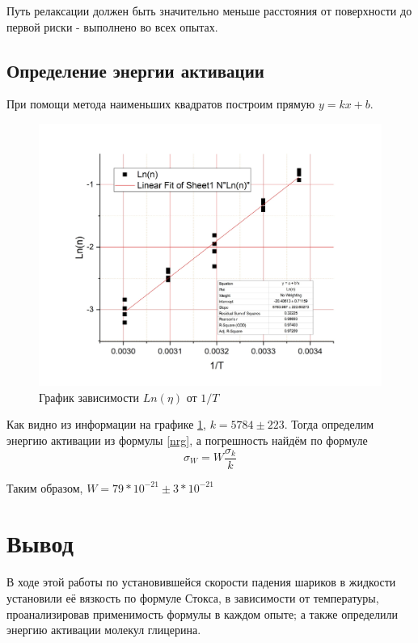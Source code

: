 \documentclass[a4paper]{article}
\begin{document}
Путь релаксации должен быть значительно меньше расстояния от поверхности до первой риски - выполнено во всех опытах.

\subsection{Определение энергии активации}
При помощи метода наименьших квадратов построим прямую $y = kx + b$.
\begin{figure}[h]
\includegraphics[scale=0.25]{1}
\caption{График зависимости $Ln(\eta)$ от $1/T$}
\label{gr}
\end{figure}
Как видно из информации на графике \ref{gr}, $k = 5784\pm 223$. 
Тогда определим энергию активации из формулы \ref{nrg}, а погрешность найдём по формуле 
\begin{equation}
\sigma_W = W \frac{\sigma_k}{k}
\end{equation}

Таким образом, $W=79*10^{-21}\pm 3*10^{-21}$
\section{Вывод}
В ходе этой работы по установившейся скорости падения шариков в жидкости установили её вязкость по формуле Стокса, в зависимости от температуры, проанализировав применимость формулы в каждом опыте; а также определили энергию активации молекул глицерина.
\end{document}
